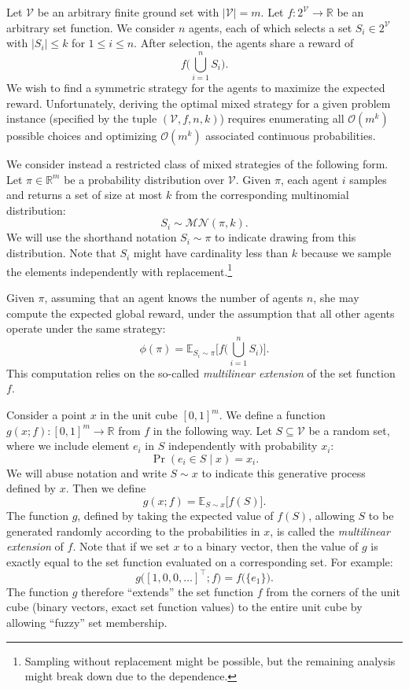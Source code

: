 \documentclass{article}
\newcommand{\given}{\mid}
\newcommand{\cm}[1]{\mathcal{#1}}
\newcommand{\R}{\mathbb{R}}
\newcommand{\trans}{^{\top}}
\begin{document}
Let $\cm{V}$ be an arbitrary finite ground set with $\lvert \cm{V}
\rvert = m$.  Let $f\colon 2^{\cm{V}} \to \R$ be an arbitrary set
function.  We consider $n$ agents, each of which selects a set $S_i
\in 2^\cm{V}$ with $\lvert S_i \rvert \leq k$ for $1 \leq i \leq n$.
After selection, the agents share a reward of
\[
  f\biggl( \bigcup_{i = 1}^n S_i \biggr).
\]
We wish to find a symmetric strategy for the agents to maximize the
expected reward.  Unfortunately, deriving the optimal mixed strategy
for a given problem instance (specified by the tuple $(\cm{V}, f, n,
k)$) requires enumerating all $\cm{O}(m^k)$ possible choices and
optimizing $\cm{O}(m^k)$ associated continuous probabilities.

We consider instead a restricted class of mixed strategies of the
following form. Let $\pi \in \R^m$ be a probability distribution over
$\cm{V}$.  Given $\pi$, each agent $i$ samples and returns a set of
size at most $k$ from the corresponding multinomial distribution:
\[
  S_i \sim \cm{MN}(\pi, k).
\]
We will use the shorthand notation $S_i \sim \pi$ to indicate drawing
from this distribution.  Note that $S_i$ might have cardinality less
than $k$ because we sample the elements independently with
replacement.\footnote{Sampling without replacement might be possible,
  but the remaining analysis might break down due to the dependence.}

Given $\pi$, assuming that an agent knows the number of agents $n$,
she may compute the expected global reward, under the assumption
that all other agents operate under the same strategy:
\[
  \phi(\pi)
  =
  \mathbb{E}_{S_i \sim \pi}
  \Biggl[
    f\biggl( \bigcup_{i = 1}^n S_i \biggr)
  \Biggr].
\]
This computation relies on the so-called \emph{multilinear extension}
of the set function $f$.

Consider a point $x$ in the unit cube $[0, 1]^m$.  We define a
function $g(x; f)\colon [0, 1]^m \to \R$ from $f$ in the following
way.  Let $S \subseteq \cm{V}$ be a random set, where we include
element $e_i$ in $S$ independently with probability $x_i$:
\[
  \Pr(e_i \in S \given x) = x_i.
\]
We will abuse notation and write $S \sim x$ to indicate this
generative process defined by $x$.  Then we define
\[
  g(x; f) = \mathbb{E}_{S \sim x}\bigl[f(S)\bigr].
\]
The function $g$, defined by taking the expected value of $f(S)$,
allowing $S$ to be generated randomly according to the probabilities
in $x$, is called the \emph{multilinear extension} of $f$.  Note that
if we set $x$ to a binary vector, then the value of $g$ is exactly
equal to the set function evaluated on a corresponding set.  For example:
\[
  g\bigl([1, 0, 0, \dots]\trans; f\bigr) = f\bigl(\{ e_1 \}\bigr).
\]
The function $g$ therefore ``extends'' the set function $f$ from the
corners of the unit cube (binary vectors, exact set function values)
to the entire unit cube by allowing ``fuzzy'' set membership.
\end{document}
